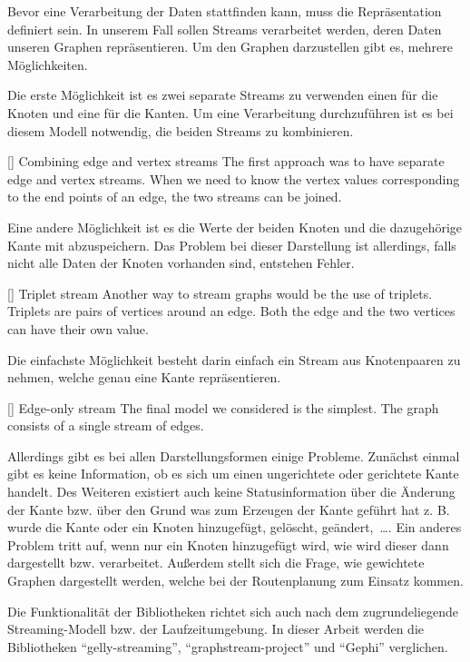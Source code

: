 Bevor eine Verarbeitung der Daten stattfinden kann, muss die Repräsentation
definiert sein. In unserem Fall sollen Streams verarbeitet werden, deren Daten
unseren Graphen repräsentieren. Um den Graphen darzustellen gibt es, mehrere
Möglichkeiten.

Die erste Möglichkeit ist es zwei separate Streams zu verwenden einen für die
Knoten und eine für die Kanten. Um eine Verarbeitung durchzuführen ist es bei
diesem Modell notwendig, die beiden Streams zu kombinieren.

[\cite{Bali2015}]{
Combining edge and vertex streams The first approach was to have separate
edge and vertex streams. When we need to know the vertex values corresponding
to the end points of an edge, the two streams can be joined.
}

Eine andere Möglichkeit ist es die Werte der beiden Knoten und die dazugehörige
Kante mit abzuspeichern. Das Problem bei dieser Darstellung ist allerdings, 
falls nicht alle Daten der Knoten vorhanden sind, entstehen Fehler.

[\cite{Bali2015}]{
Triplet stream Another way to stream graphs would be the use of triplets.
Triplets are pairs of vertices around an edge. Both the edge and the two vertices
can have their own value.
}

Die einfachste Möglichkeit besteht darin einfach ein Stream aus Knotenpaaren zu
nehmen, welche genau eine Kante repräsentieren.

[\cite{Bali2015}]{
Edge-only stream The final model we considered is the simplest. The graph
consists of a single stream of edges.
}

Allerdings gibt es bei allen Darstellungsformen einige Probleme. Zunächst einmal
gibt es keine Information, ob es sich um einen ungerichtete oder gerichtete
Kante handelt. Des Weiteren existiert auch keine Statusinformation über die
Änderung der Kante bzw. über den Grund was zum Erzeugen der Kante geführt hat
z. B. wurde die Kante oder ein Knoten hinzugefügt, gelöscht, geändert,~\dots .
Ein anderes Problem tritt auf, wenn nur ein Knoten hinzugefügt wird, wie wird
dieser dann dargestellt bzw. verarbeitet. Außerdem stellt sich die Frage, wie
gewichtete Graphen dargestellt werden, welche bei der Routenplanung zum Einsatz
kommen.

Die Funktionalität der Bibliotheken richtet sich auch nach dem zugrundeliegende
Streaming-Modell bzw. der Laufzeitumgebung. In dieser Arbeit werden die
Bibliotheken \enquote{gelly-streaming}, \enquote{graphstream-project} und
\enquote{Gephi} verglichen.

